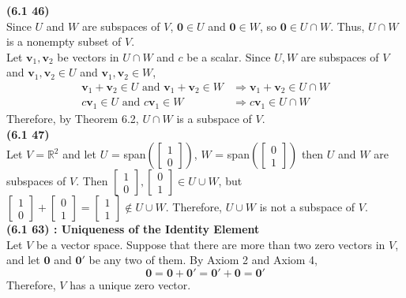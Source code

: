 \textbf{(6.1 46)} \\
Since $U$ and $W$ are subspaces of $V$, $\textbf{0} \in U$ and $\textbf{0} \in W$, so $\textbf{0} \in U \cap W$. Thus, $U \cap W$ is a nonempty subset of $V$. \\

Let $\textbf{v}_1, \textbf{v}_2$ be vectors in $U \cap W$ and $c$ be a scalar. Since $U, W$ are subspaces of $V$  and $\textbf{v}_1, \textbf{v}_2 \in U$ and $\textbf{v}_1, \textbf{v}_2 \in W$, \begin{align*}
	\textbf{v}_1 + \textbf{v}_2 \in U \mbox{ and } \textbf{v}_1 + \textbf{v}_2 \in W &\Rightarrow \textbf{v}_1 + \textbf{v}_2 \in U \cap W \\
	c\textbf{v}_1 \in U \mbox{ and } c\textbf{v}_1 \in W &\Rightarrow c\textbf{v}_1 \in U \cap W
\end{align*} Therefore, by Theorem 6.2, $U \cap W$ is a subspace of $V$. \\

\textbf{(6.1 47)} \\
Let $V = \mathbb{R}^2$ and let $U$ = span$\left(\begin{bmatrix}
	1 \\ 0
\end{bmatrix}\right)$, $W$ = span$\left(\begin{bmatrix}
	0 \\ 1
\end{bmatrix}\right)$ then $U$ and $W$ are subspaces of $V$. Then $\begin{bmatrix}
	1 \\ 0
\end{bmatrix}, \begin{bmatrix}
	0 \\ 1
\end{bmatrix} \in U \cup W$, but $\begin{bmatrix}
	1 \\ 0
\end{bmatrix} + \begin{bmatrix}
	0 \\ 1
\end{bmatrix} = \begin{bmatrix}
	1 \\ 1
\end{bmatrix} \notin U \cup W$. Therefore, $U \cup W$ is not a subspace of $V$. \\

\textbf{(6.1 63) : Uniqueness of the Identity Element} \\
Let $V$ be a vector space. Suppose that there are more than two zero vectors in $V$, and let $\textbf{0}$ and $\textbf{0}'$ be any two of them. By Axiom 2 and Axiom 4, \begin{equation*}
	\textbf{0} = \textbf{0} + \textbf{0}' = \textbf{0}' + \textbf{0} = \textbf{0}'
\end{equation*} Therefore, $V$ has a unique zero vector. \\

